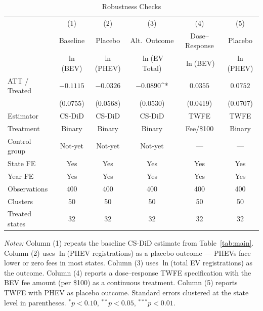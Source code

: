 \begin{table}[t]
\centering
\caption{Robustness Checks}
\label{tab:robustness}
\begin{tabular}{lccccc}
\toprule
 & (1) & (2) & (3) & (4) & (5) \\
 & Baseline & Placebo & Alt.\ Outcome & Dose--Response & Placebo \\
 & $\ln$(BEV) & $\ln$(PHEV) & $\ln$(EV Total) & $\ln$(BEV) & $\ln$(PHEV) \\
\midrule
ATT / Treated & $-0.1115$ & $-0.0326$ & $-0.0890$^{*} & $0.0355$ & $0.0752$ \\
 & (0.0755) & (0.0568) & (0.0530) & (0.0419) & (0.0707) \\
[4pt]
Estimator & CS-DiD & CS-DiD & CS-DiD & TWFE & TWFE \\
Treatment & Binary & Binary & Binary & Fee/\$100 & Binary \\
Control group & Not-yet & Not-yet & Not-yet & --- & --- \\
State FE & Yes & Yes & Yes & Yes & Yes \\
Year FE & Yes & Yes & Yes & Yes & Yes \\
\midrule
Observations & 400 & 400 & 400 & 400 & 400 \\
Clusters & 50 & 50 & 50 & 50 & 50 \\
Treated states & 32 & 32 & 32 & 32 & 32 \\
\bottomrule
\end{tabular}
\begin{tablenotes}[flushleft]\small
\item \textit{Notes:} Column (1) repeats the baseline CS-DiD estimate from Table~\ref{tab:main}. Column (2) uses $\ln$(PHEV registrations) as a placebo outcome --- PHEVs face lower or zero fees in most states. Column (3) uses $\ln$(total EV registrations) as the outcome. Column (4) reports a dose--response TWFE specification with the BEV fee amount (per \$100) as a continuous treatment. Column (5) reports TWFE with PHEV as placebo outcome. Standard errors clustered at the state level in parentheses. $^{*}p<0.10$, $^{**}p<0.05$, $^{***}p<0.01$.
\end{tablenotes}
\end{table}

